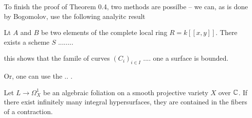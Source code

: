\documentclass[12pt]{article}
\begin{document}
To finish the proof of Theorem 0.4, two methods are possilbe -- we can, as is done by Bogomolov, use the following analyitc result

\begin{theorem}[Seidenberg]
Lt $A$ and $B$ be two elements of the complete local ring $R = k[[x,y]]$. There exists a scheme $S$ ........
\end{theorem}
 
this shows that the famile of curves $(C_i)_{i \in I}$ .... one a surface is bounded. 
 
Or, one can use the .. .


\begin{theorem}[Jouanolou]
Let $L \to \Omega_X^1$ be an algebraic foliation on a smooth projective variety $X$ over $\mathbb{C}$. If there exist infinitely many integral hypersurfaces, they are contained in the fibers of a contraction.
\end{theorem} 
 
\end{document}
